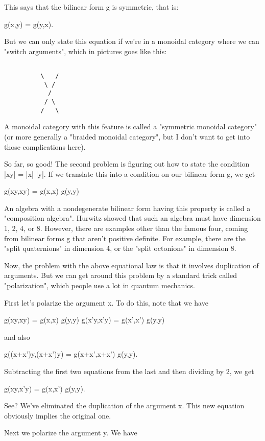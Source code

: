 This says that the bilinear form g is symmetric, that is:

g(x,y) = g(y,x).  

But we can only state this equation if we're in a monoidal category
where we can "switch arguments", which in pictures goes like this:


\begin{verbatim}

          \   /              
           \ /       
            /        
           / \       
          /   \   
\end{verbatim}
    
A monoidal category with this feature is called a "symmetric
monoidal category" (or more generally a "braided monoidal
category", but I don't want to get into those complications here).

So far, so good!  The second problem is figuring out how to state the
condition |xy| = |x| |y|.  If we translate this into a condition on our
bilinear form g, we get

g(xy,xy) = g(x,x) g(y,y)

An algebra with a nondegenerate bilinear form having this property is
called a "composition algebra".  Hurwitz showed that such an
algebra must have dimension 1, 2, 4, or 8.  However, there are examples
other than the famous four, coming from bilinear forms g that aren't
positive definite.  For example, there are the "split
quaternions" in dimension 4, or the "split octonions" in
dimension 8.

Now, the problem with the above equational law is that it involves
duplication of arguments.  But we can get around this problem by a
standard trick called "polarization", which people use a lot in 
quantum mechanics.   

First let's polarize the argument x.  To do this, note that we have

g(xy,xy) = g(x,x) g(y,y) 
g(x'y,x'y) = g(x',x') g(y,y)

and also

g((x+x')y,(x+x')y) = g(x+x',x+x') g(y,y).

Subtracting the first two equations from the last and then dividing by
2, we get

g(xy,x'y) = g(x,x') g(y,y).

See?  We've eliminated the duplication of the argument x.  This new
equation obviously implies the original one.  

Next we polarize the argument y.   We have

